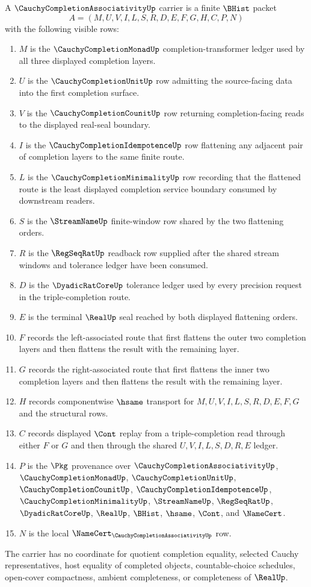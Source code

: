 \begin{definition}
\label{def:cauchy-completion-associativity-carrier}
A $\CauchyCompletionAssociativityUp$ carrier is a finite $\BHist$ packet
$$
A=(M,U,V,I,L,S,R,D,E,F,G,H,C,P,N)
$$
with the following visible rows:
\begin{enumerate}
\item $M$ is the $\CauchyCompletionMonadUp$ completion-transformer ledger used by all three displayed completion layers.
\item $U$ is the $\CauchyCompletionUnitUp$ row admitting the source-facing data into the first completion surface.
\item $V$ is the $\CauchyCompletionCounitUp$ row returning completion-facing reads to the displayed real-seal boundary.
\item $I$ is the $\CauchyCompletionIdempotenceUp$ row flattening any adjacent pair of completion layers to the same finite route.
\item $L$ is the $\CauchyCompletionMinimalityUp$ row recording that the flattened route is the least displayed completion service boundary consumed by downstream readers.
\item $S$ is the $\StreamNameUp$ finite-window row shared by the two flattening orders.
\item $R$ is the $\RegSeqRatUp$ readback row supplied after the shared stream windows and tolerance ledger have been consumed.
\item $D$ is the $\DyadicRatCoreUp$ tolerance ledger used by every precision request in the triple-completion route.
\item $E$ is the terminal $\RealUp$ seal reached by both displayed flattening orders.
\item $F$ records the left-associated route that first flattens the outer two completion layers and then flattens the result with the remaining layer.
\item $G$ records the right-associated route that first flattens the inner two completion layers and then flattens the result with the remaining layer.
\item $H$ records componentwise $\hsame$ transport for $M,U,V,I,L,S,R,D,E,F,G$ and the structural rows.
\item $C$ records displayed $\Cont$ replay from a triple-completion read through either $F$ or $G$ and then through the shared $U,V,I,L,S,D,R,E$ ledger.
\item $P$ is the $\Pkg$ provenance over $\CauchyCompletionAssociativityUp$, $\CauchyCompletionMonadUp$, $\CauchyCompletionUnitUp$, $\CauchyCompletionCounitUp$, $\CauchyCompletionIdempotenceUp$, $\CauchyCompletionMinimalityUp$, $\StreamNameUp$, $\RegSeqRatUp$, $\DyadicRatCoreUp$, $\RealUp$, $\BHist$, $\hsame$, $\Cont$, and $\NameCert$.
\item $N$ is the local $\NameCert_{\CauchyCompletionAssociativityUp}$ row.
\end{enumerate}
The carrier has no coordinate for quotient completion equality, selected Cauchy representatives, host equality of completed objects, countable-choice schedules, open-cover compactness, ambient completeness, or completeness of $\RealUp$.
\end{definition}

